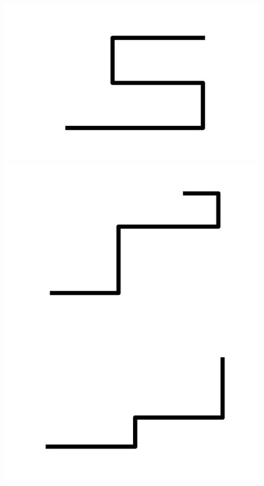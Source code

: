 \documentclass[]{report}
\begin{document}
\includegraphics[scale=.1]{pictures/21/state_cluster_shapes_385.pdf} 
\includegraphics[scale=.1]{pictures/21/state_cluster_shapes_386.pdf} 
\includegraphics[scale=.1]{pictures/21/state_cluster_shapes_387.pdf} 
\end{document}
